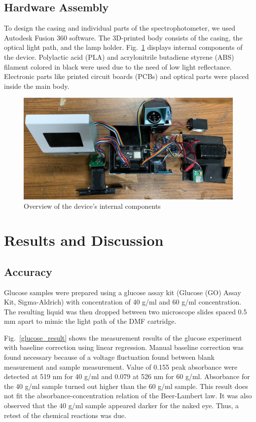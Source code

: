 \documentclass[conference]{IEEEtran}
\begin{document}
\subsection{Hardware Assembly}
To design the casing and individual parts of the spectrophotometer, we used Autodesk Fusion 360 software.
The 3D-printed body consists of the casing, the optical light path, and the lamp holder.
Fig.~\ref{hardware} displays internal components of the device.
Polylactic acid (PLA) and acrylonitrile butadiene styrene (ABS) filament colored in black were used due to the need of low light reflectance.
Electronic parts like printed circuit boards (PCBs) and optical parts were placed inside the main body.

    \begin{figure}[htbp]
    \centerline{\includegraphics[scale=0.15]{hardware-2.jpg}}
    \caption{Overview of the device's internal components}
    \label{hardware}
    \end{figure}

\section{Results and Discussion}
\subsection{Accuracy}
Glucose samples were prepared using a glucose assay kit (Glucose (GO) Assay Kit, Sigma-Aldrich\cite{b6}) with concentration of 40 {\textmu}g/ml and 60 {\textmu}g/ml concentration.
The resulting liquid was then dropped between two microscope slides spaced 0.5 mm apart to mimic the light path of the DMF cartridge.

Fig.~\ref{glucose_result} shows the measurement results of the glucose experiment with baseline correction using linear regression.
Manual baseline correction was found necessary because of a voltage fluctuation found between blank measurement and sample measurement.
Value of 0.155 peak absorbance were detected at 519 nm for 40 {\textmu}g/ml and 0.079 at 526 nm for 60 {\textmu}g/ml.
Absorbance for the 40 {\textmu}g/ml sample turned out higher than the 60 {\textmu}g/ml sample.
This result does not fit the absorbance-concentration relation of the Beer-Lambert law.
It was also observed that the 40 {\textmu}g/ml sample appeared darker for the naked eye.
Thus, a retest of the chemical reactions was due.
\end{document}
